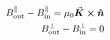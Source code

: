 

\vspace*{\fill}
\centering

\begin{align*}
   B^{\parallel}_{\rm out} - B^{\parallel}_{\rm in} = \mu_0 \va*{K} \cross \vu*{n} \\
   B^{\perp}_{\rm out} - B^{\perp}_{\rm in} = 0
\end{align*}

\centering
\vspace*{\fill}

